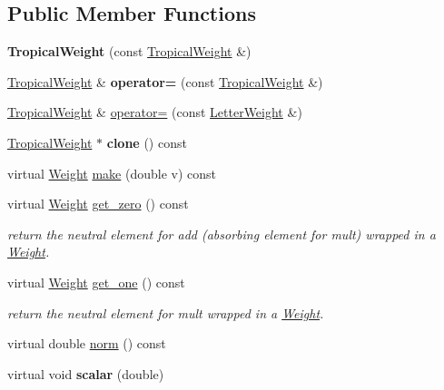 \subsection*{Public Member Functions}
\begin{DoxyCompactItemize}
\item 
{\bfseries Tropical\+Weight} (const \mbox{\hyperlink{classTropicalWeight}{Tropical\+Weight}} \&)
\item 
\mbox{\hyperlink{classTropicalWeight}{Tropical\+Weight}} \& {\bfseries operator=} (const \mbox{\hyperlink{classTropicalWeight}{Tropical\+Weight}} \&)
\item 
\mbox{\hyperlink{classTropicalWeight}{Tropical\+Weight}} \& \mbox{\hyperlink{group__weight_ga3aeb0d5a945daa39a0ed9a02fe92f246}{operator=}} (const \mbox{\hyperlink{classLetterWeight}{Letter\+Weight}} \&)
\item 
\mbox{\hyperlink{classTropicalWeight}{Tropical\+Weight}} $\ast$ {\bfseries clone} () const
\item 
virtual \mbox{\hyperlink{classWeight}{Weight}} \mbox{\hyperlink{classTropicalWeight_abc00c8fe56beedff6b7192325833d6d3}{make}} (double v) const
\item 
\mbox{\label{classTropicalWeight_a8de59f3233cfd822712b04d6069f5256}} 
virtual \mbox{\hyperlink{classWeight}{Weight}} \mbox{\hyperlink{classTropicalWeight_a8de59f3233cfd822712b04d6069f5256}{get\+\_\+zero}} () const
\begin{DoxyCompactList}\small\item\em return the neutral element for add (absorbing element for mult) wrapped in a \mbox{\hyperlink{classWeight}{Weight}}. \end{DoxyCompactList}\item 
\mbox{\label{classTropicalWeight_a62d1dc9815ba6ba04665047ba6581731}} 
virtual \mbox{\hyperlink{classWeight}{Weight}} \mbox{\hyperlink{classTropicalWeight_a62d1dc9815ba6ba04665047ba6581731}{get\+\_\+one}} () const
\begin{DoxyCompactList}\small\item\em return the neutral element for mult wrapped in a \mbox{\hyperlink{classWeight}{Weight}}. \end{DoxyCompactList}\item 
virtual double \mbox{\hyperlink{group__weight_gabea8959ba2b8538194c3aadf5f9e4941}{norm}} () const
\item 
virtual void {\bfseries scalar} (double)

\end{DoxyCompactItemize}
